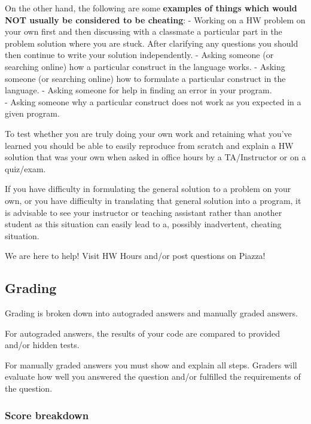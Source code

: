 \documentclass[11pt]{article}
\begin{document}
On the other hand, the following are some \textbf{examples of things
which would NOT usually be considered to be cheating}: - Working on a HW
problem on your own first and then discussing with a classmate a
particular part in the problem solution where you are stuck. After
clarifying any questions you should then continue to write your solution
independently. - Asking someone (or searching online) how a particular
construct in the language works. - Asking someone (or searching online)
how to formulate a particular construct in the language. - Asking
someone for help in finding an error in your program.\\
- Asking someone why a particular construct does not work as you
expected in a given program.

To test whether you are truly doing your own work and retaining what
you've learned you should be able to easily reproduce from scratch and
explain a HW solution that was your own when asked in office hours by a
TA/Instructor or on a quiz/exam.

If you have difficulty in formulating the general solution to a problem
on your own, or you have difficulty in translating that general solution
into a program, it is advisable to see your instructor or teaching
assistant rather than another student as this situation can easily lead
to a, possibly inadvertent, cheating situation.

We are here to help! Visit HW Hours and/or post questions on Piazza!

    \subsection{Grading}\label{grading}

Grading is broken down into autograded answers and manually graded
answers.

For autograded answers, the results of your code are compared to
provided and/or hidden tests.

For manually graded answers you must show and explain all steps. Graders
will evaluate how well you answered the question and/or fulfilled the
requirements of the question.

\subsubsection{Score breakdown}\label{score-breakdown}
\end{document}
